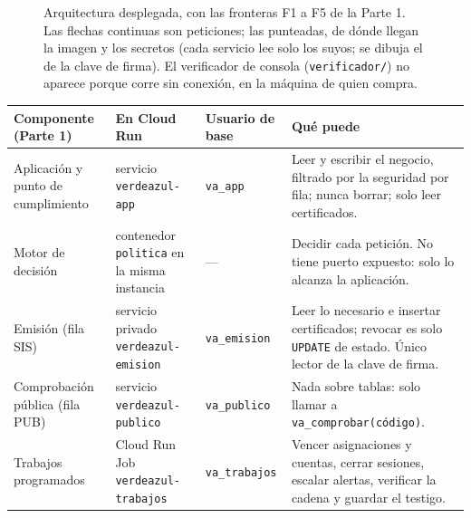 \documentclass[11pt,letterpaper]{article}
\newcommand{\cab}[1]{\textbf{\rmfamily #1}}
\newcommand{\cod}[1]{\texttt{\small #1}}
\newcommand{\arch}[1]{\texttt{\small #1}}
\begin{document}
\begin{figure}[H]
\caption{Arquitectura desplegada, con las fronteras F1 a F5 de la Parte 1. Las flechas continuas son peticiones; las punteadas, de dónde llegan la imagen y los secretos (cada servicio lee solo los suyos; se dibuja el de la clave de firma). El verificador de consola (\arch{verificador/}) no aparece porque corre sin conexión, en la máquina de quien compra.}
\label{fig:arquitectura}
\end{figure}

\begin{center}
\footnotesize
\renewcommand{\arraystretch}{1.12}
\begin{tabularx}{\textwidth}{@{}L{2.5cm} L{2.6cm} L{2.4cm} Y@{}}
\toprule
\cab{Componente (Parte 1)} & \cab{En Cloud Run} & \cab{Usuario de base} & \cab{Qué puede} \\
\midrule
Aplicación y punto de cumplimiento & servicio \cod{verdeazul-app} & \cod{va\_app} & Leer y escribir el negocio, filtrado por la seguridad por fila; nunca borrar; solo leer certificados. \\
Motor de decisión & contenedor \cod{politica} en la misma instancia & — & Decidir cada petición. No tiene puerto expuesto: solo lo alcanza la aplicación. \\
Emisión (fila SIS) & servicio privado \cod{verdeazul-emision} & \cod{va\_emision} & Leer lo necesario e insertar certificados; revocar es solo \cod{UPDATE} de estado. Único lector de la clave de firma. \\
Comprobación pública (fila PUB) & servicio \cod{verdeazul-publico} & \cod{va\_publico} & Nada sobre tablas: solo llamar a \cod{va\_comprobar(código)}. \\
Trabajos programados & Cloud Run Job \cod{verdeazul-trabajos} & \cod{va\_trabajos} & Vencer asignaciones y cuentas, cerrar sesiones, escalar alertas, verificar la cadena y guardar el testigo. \\
\bottomrule
\end{tabularx}
\end{center}
\end{document}
